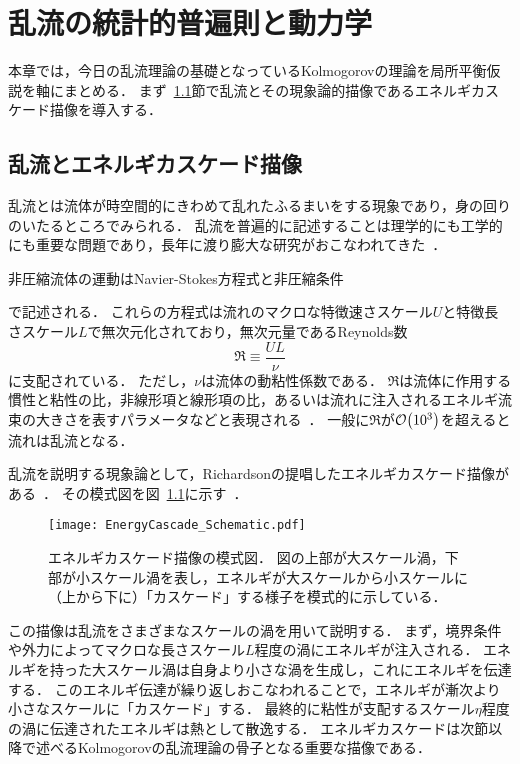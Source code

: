 \chapter{乱流の統計的普遍則と動力学}
\label{chap:StatisticalUniversalityAndDynamicsOfTurbulence}

本章では，今日の乱流理論の基礎となっているKolmogorovの理論を局所平衡仮説を軸にまとめる．
まず~\ref{sec:TurbulenceAndEnergyCascadePicture}節で乱流とその現象論的描像であるエネルギカスケード描像を導入する．


\section{乱流とエネルギカスケード描像}
\label{sec:TurbulenceAndEnergyCascadePicture}

乱流とは流体が時空間的にきわめて乱れたふるまいをする現象であり，身の回りのいたるところでみられる．
乱流を普遍的に記述することは理学的にも工学的にも重要な問題であり，長年に渡り膨大な研究がおこなわれてきた~\cite{tennekes1972first,Landau1987Fluid,KidaYanase,frisch1995tlk}．

非圧縮流体の運動はNavier-Stokes方程式と非圧縮条件
で記述される．
これらの方程式は流れのマクロな特徴速さスケール\(U\)と特徴長さスケール\(L\)で無次元化されており，無次元量であるReynolds数
\begin{equation}
  \Re \equiv \frac{UL}{\nu}
  \label{eq:LEHASU_DefOfReynoldsNumber}
\end{equation}
に支配されている．
ただし，\(\nu\)は流体の動粘性係数である．
\(\Re\)は流体に作用する慣性と粘性の比，非線形項と線形項の比，あるいは流れに注入されるエネルギ流束の大きさを表すパラメータなどと表現される~\cite[p.~8, p.~409]{Tatsumi}．
一般に\(\Re\)が\(\order{10^3}\)を超えると流れは乱流となる．

乱流を説明する現象論として，Richardsonの提唱したエネルギカスケード描像がある~\cite{Goto2017a,GotoJPS2018}．
その模式図を図~\ref{fig:EnergyCascade_Schematic.pdf}に示す~\cite{gotolab}．
\begin{figure}[!t]
  \centering
  \texttt{[image: EnergyCascade\_Schematic.pdf]}
  \caption{
    エネルギカスケード描像の模式図．
    図の上部が大スケール渦，下部が小スケール渦を表し，エネルギが大スケールから小スケールに（上から下に）「カスケード」する様子を模式的に示している．}
  \label{fig:EnergyCascade_Schematic.pdf}
\end{figure}
この描像は乱流をさまざまなスケールの渦を用いて説明する．
まず，境界条件や外力によってマクロな長さスケール\(L\)程度の渦にエネルギが注入される．
エネルギを持った大スケール渦は自身より小さな渦を生成し，これにエネルギを伝達する．
このエネルギ伝達が繰り返しおこなわれることで，エネルギが漸次より小さなスケールに「カスケード」する．
最終的に粘性が支配するスケール\(\eta\)程度の渦に伝達されたエネルギは熱として散逸する．
エネルギカスケードは次節以降で述べるKolmogorovの乱流理論の骨子となる重要な描像である．
